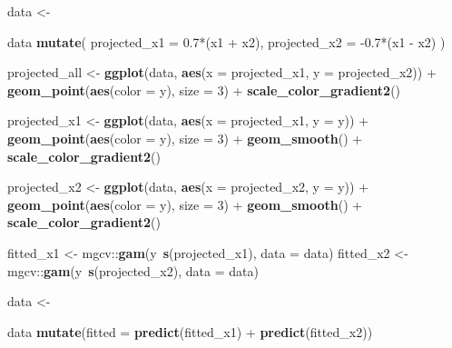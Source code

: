 \documentclass[]{book}
\newenvironment{Shaded}{\begin{snugshade}}{\end{snugshade}}
\newcommand{\KeywordTok}[1]{\textcolor[rgb]{0.13,0.29,0.53}{\textbf{{#1}}}}
\newcommand{\DataTypeTok}[1]{\textcolor[rgb]{0.13,0.29,0.53}{{#1}}}
\newcommand{\DecValTok}[1]{\textcolor[rgb]{0.00,0.00,0.81}{{#1}}}
\newcommand{\FloatTok}[1]{\textcolor[rgb]{0.00,0.00,0.81}{{#1}}}
\newcommand{\StringTok}[1]{\textcolor[rgb]{0.31,0.60,0.02}{{#1}}}
\newcommand{\NormalTok}[1]{{#1}}
\begin{document}
\begin{Shaded}
\begin{Highlighting}[]
\NormalTok{data <-}\StringTok{ }\NormalTok{data %
\StringTok{  }\KeywordTok{mutate}\NormalTok{(}
    \DataTypeTok{projected_x1 =} \FloatTok{0.7}\NormalTok{*(x1 +}\StringTok{ }\NormalTok{x2),}
    \DataTypeTok{projected_x2 =} \NormalTok{-}\FloatTok{0.7}\NormalTok{*(x1 -}\StringTok{ }\NormalTok{x2)}
  \NormalTok{)}

\NormalTok{projected_all <-}\StringTok{ }\KeywordTok{ggplot}\NormalTok{(data, }\KeywordTok{aes}\NormalTok{(}\DataTypeTok{x =} \NormalTok{projected_x1, }\DataTypeTok{y =} \NormalTok{projected_x2)) +}\StringTok{ }
\StringTok{  }\KeywordTok{geom_point}\NormalTok{(}\KeywordTok{aes}\NormalTok{(}\DataTypeTok{color =} \NormalTok{y), }\DataTypeTok{size =} \DecValTok{3}\NormalTok{) +}\StringTok{ }
\StringTok{  }\KeywordTok{scale_color_gradient2}\NormalTok{()}

\NormalTok{projected_x1 <-}\StringTok{ }\KeywordTok{ggplot}\NormalTok{(data, }\KeywordTok{aes}\NormalTok{(}\DataTypeTok{x =} \NormalTok{projected_x1, }\DataTypeTok{y =} \NormalTok{y)) +}\StringTok{ }
\StringTok{  }\KeywordTok{geom_point}\NormalTok{(}\KeywordTok{aes}\NormalTok{(}\DataTypeTok{color =} \NormalTok{y), }\DataTypeTok{size =} \DecValTok{3}\NormalTok{) +}\StringTok{ }
\StringTok{  }\KeywordTok{geom_smooth}\NormalTok{() +}\StringTok{ }
\StringTok{  }\KeywordTok{scale_color_gradient2}\NormalTok{()}

\NormalTok{projected_x2 <-}\StringTok{ }\KeywordTok{ggplot}\NormalTok{(data, }\KeywordTok{aes}\NormalTok{(}\DataTypeTok{x =} \NormalTok{projected_x2, }\DataTypeTok{y =} \NormalTok{y)) +}\StringTok{ }
\StringTok{  }\KeywordTok{geom_point}\NormalTok{(}\KeywordTok{aes}\NormalTok{(}\DataTypeTok{color =} \NormalTok{y), }\DataTypeTok{size =} \DecValTok{3}\NormalTok{) +}\StringTok{ }
\StringTok{  }\KeywordTok{geom_smooth}\NormalTok{() +}\StringTok{ }
\StringTok{  }\KeywordTok{scale_color_gradient2}\NormalTok{()}

\NormalTok{fitted_x1 <-}\StringTok{ }\NormalTok{mgcv::}\KeywordTok{gam}\NormalTok{(y~}\KeywordTok{s}\NormalTok{(projected_x1), }\DataTypeTok{data =} \NormalTok{data)}
\NormalTok{fitted_x2 <-}\StringTok{ }\NormalTok{mgcv::}\KeywordTok{gam}\NormalTok{(y~}\KeywordTok{s}\NormalTok{(projected_x2), }\DataTypeTok{data =} \NormalTok{data)}

\NormalTok{data <-}\StringTok{ }\NormalTok{data %
\StringTok{  }\KeywordTok{mutate}\NormalTok{(}\DataTypeTok{fitted =} \KeywordTok{predict}\NormalTok{(fitted_x1) +}\StringTok{ }\KeywordTok{predict}\NormalTok{(fitted_x2))}

}}
\end{Highlighting}
\end{Shaded}
\end{document}
